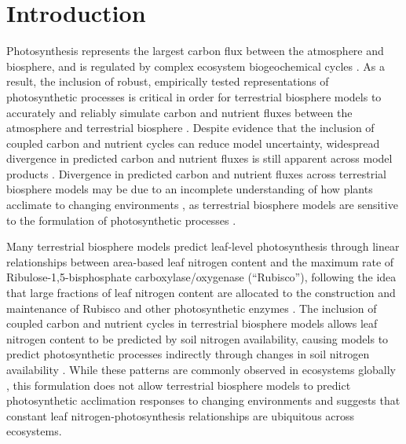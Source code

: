 \chapter{\textbf{Introduction}}

\noindent Photosynthesis represents the largest carbon flux between the atmosphere and biosphere, and is regulated by complex ecosystem biogeochemical cycles . As a result, the inclusion of robust, empirically tested representations of photosynthetic processes is critical in order for terrestrial biosphere models to accurately and reliably simulate carbon and nutrient fluxes between the atmosphere and terrestrial biosphere . Despite evidence that the inclusion of coupled carbon and nutrient cycles can reduce model uncertainty, widespread divergence in predicted carbon and nutrient fluxes is still apparent across model products . Divergence in predicted carbon and nutrient fluxes across terrestrial biosphere models may be due to an incomplete understanding of how plants acclimate to changing environments , as terrestrial biosphere models are sensitive to the formulation of photosynthetic processes .

Many terrestrial biosphere models predict leaf-level photosynthesis through linear relationships between area-based leaf nitrogen content and the maximum rate of Ribulose-1,5-bisphosphate carboxylase/oxygenase (``Rubisco''), following the idea that large fractions of leaf nitrogen content are allocated to the construction and maintenance of Rubisco and other photosynthetic enzymes . The inclusion of coupled carbon and nutrient cycles in terrestrial biosphere models  allows leaf nitrogen content to be predicted by soil nitrogen availability, causing models to predict photosynthetic processes indirectly through changes in soil nitrogen availability . While these patterns are commonly observed in ecosystems globally , this formulation does not allow terrestrial biosphere models to predict photosynthetic acclimation responses to changing environments  and suggests that constant leaf nitrogen-photosynthesis relationships are ubiquitous across ecosystems.

